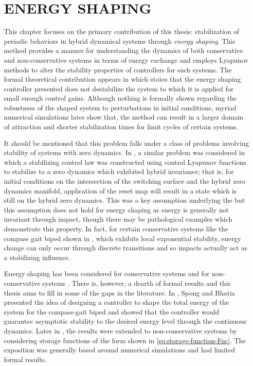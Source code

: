 \chapter{\uppercase{Energy Shaping}} \label{ch:energy-shaping}

This chapter focuses on the primary contribution of this thesis: stabilization
 of periodic behaviors in hybrid dynamical systems through {\em energy shaping}.
%
This method provides a manner for understanding the dynamics of both
conservative and  non-conservative systems in terms of energy exchange and
employs Lyapunov methods to alter the stability properties of controllers for
such systems.
%
The formal theoretical contribution appears in 
which states that the energy shaping controller presented does not destabilize
the system to which it is applied for small enough control gains.
%
Although nothing is formally shown regarding the robustness of the shaped system
to perturbations in initial conditions, myriad numerical simulations later show
that, the method can result in a larger domain of attraction and shorter
stabilization times for limit cycles of certain systems.

It should be mentioned that this problem falls under a class of problems
involving stability of systems with zero dynamics.
%
In \cite{Ames2014}, a similar problem was considered in which a stabilizing
control law was constructed using control Lyapunov functions to stabilize to a
zero dynamics which exhibited hybrid invariance;
%
that is, for initial conditions on the intersection of the switching surface and
the hybrid zero dynamics manifold, application of the reset map will result in a
state which is still on the hybrid zero dynamics.
%
This was a key assumption underlying the \cite{Ames2014} but this assumption
does not hold for energy shaping as energy is generally not invariant through
impact, though there may be pathological examples which demonstrate this
property.
%
In fact, for certain conservative systems like the compass gait biped shown in
, which exhibits local exponential
stability, energy change can only occur through discrete transitions and so
impacts actually act as a stabilizing influence.

Energy shaping has been considered for conservative systems \cite{Spong2003} and
for non-conservative systems \cite{Spong2007}.
%
There is, however, a dearth of formal results and this thesis aims to fill in
some of the gaps in the literature.
%
In \cite{Spong2003}, Spong and Bhatia presented the idea of designing a
controller to shape the total energy of the system for the compass-gait biped
and showed that the controller would guarantee asymptotic stability to the
desired energy level through the continuous dynamics.
%
Later in \cite{Spong2007}, the results were extended to non-conservative systems
by considering storage functions of the form shown in
\eqref{eq:storage-function-Fnc}.
%
The exposition was generally based around numerical simulations and had limited
formal results.


